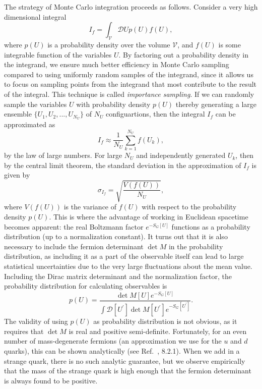 The strategy of Monte Carlo integration proceeds as follows. Consider a very high dimensional integral
\begin{equation}
    I_{f}=\int_{\mathcal{V}} \mathcal{D} U p(U) f(U),
\end{equation}
where $p(U)$ is a probability density over the volume $\mathcal V$, and $f(U)$ is some integrable function of the variables $U$. By factoring out a probability density in the integrand, we ensure much better efficiency in Monte Carlo sampling compared to using uniformly random samples of the integrand, since it allows us to focus on sampling points from the integrand that most contribute to the result of the integral. This technique is called \emph{importance sampling}. If we can randomly sample the variables $U$ with probability density $p(U)$ thereby generating a large ensemble $\{U_1,U_2,...,U_{N_U}\}$ of $N_U$ configuartions, then the integral $I_f$ can be approximated as
\begin{equation}\label{eq:mc_est}
    I_{f} \approx \frac{1}{N_{U}} \sum_{k=1}^{N_{U}} f\left(U_{k}\right),
\end{equation}
by the law of large numbers. For large $N_U$ and independently generated $U_k$, then by the central limit theorem, the standard deviation in the approximation of $I_f$ is given by
\begin{equation}
    \sigma_{I_f} = \sqrt{\frac{V(f(U))}{N_U}},
\end{equation}
where $V(f(U))$ is the variance of $f(U)$ with respect to the probability density $p(U)$. This is where the advantage of working in Euclidean spacetime becomes apparent: the real Boltzmann factor $e^{-S_G[U]}$ functions as a probability distribution (up to a normalization constant). It turns out that it is also necessary to include the fermion determinant $\det M$ in the probability distribution, as including it as a part of the observable itself can lead to large statistical uncertainties due to the very large fluctuations about the mean value.~\cite{Gattringer:2010zz} Including the Dirac matrix determinant and the normalization factor, the probability distribution for calculating observables is
\begin{equation}\label{eq:pU}
    p(U)=\frac{\operatorname{det} M[U] e^{-S_{G}[U]}}{\int \mathcal{D}\left[U^{\prime}\right] \operatorname{det} M\left[U^{\prime}\right] e^{-S_{G}\left[U^{\prime}\right]}}.
\end{equation}
The validity of using $p(U)$ as probability distribution is not obvious, as it requires that $\det M$ is real and positive semi-definite. Fortunately, for an even number of mass-degenerate fermions (an approximation we use for the $u$ and $d$ quarks), this can be shown analytically (see Ref.~\cite{Gattringer:2010zz}, 8.2.1). When we add in a strange quark, there is no such analytic guarantee, but we observe empirically that the mass of the strange quark is high enough that the fermion determinant is always found to be positive.

